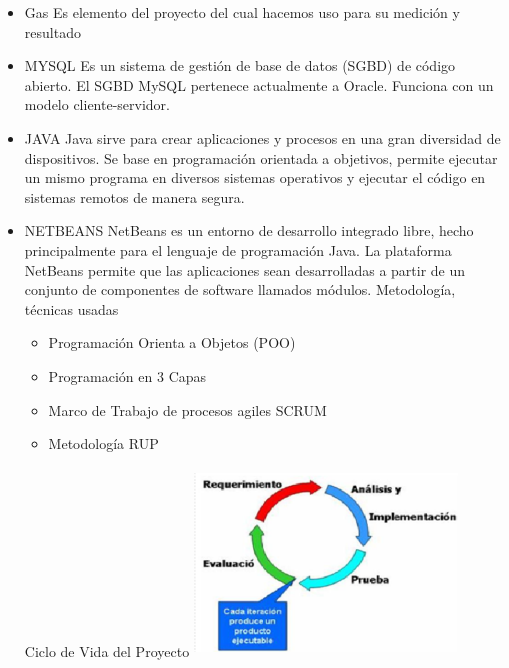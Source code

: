 \documentclass[twoside,twocolumn]{article}
\begin{document}
\begin{itemize}
\item Gas
\newline
Es elemento del proyecto del cual hacemos uso para su medición y resultado
\newline
\newline
\item MYSQL
\newline
Es un sistema de gestión de base de datos (SGBD) de código abierto. El SGBD MySQL pertenece actualmente a Oracle. Funciona con un modelo cliente-servidor.  
\newline
\newline
\item JAVA
\newline
Java sirve para crear aplicaciones y procesos en una gran diversidad de dispositivos. Se base en programación orientada a objetivos, permite ejecutar un mismo programa en diversos sistemas operativos y ejecutar el código en sistemas remotos de manera segura. 
\newline
\newline
\item NETBEANS 
\newline
NetBeans es un entorno de desarrollo integrado libre, hecho principalmente para el lenguaje de programación Java. La plataforma NetBeans permite que las aplicaciones sean desarrolladas a partir de un conjunto de componentes de software llamados módulos. 
\newline
{} Metodología, técnicas usadas
\begin{itemize}
\item Programación Orienta a Objetos (POO) 
\newline
\newline
\item Programación en 3 Capas 
\newline
\newline
\item Marco de Trabajo de procesos agiles SCRUM 
\newline
\newline
\item Metodología RUP 
\newline
\newline
\end{itemize}
Ciclo de Vida del Proyecto 
\newline
\newline
\includegraphics[width=7cm, height=5cm]{Image/6.png}


\end{itemize}
\end{document}

